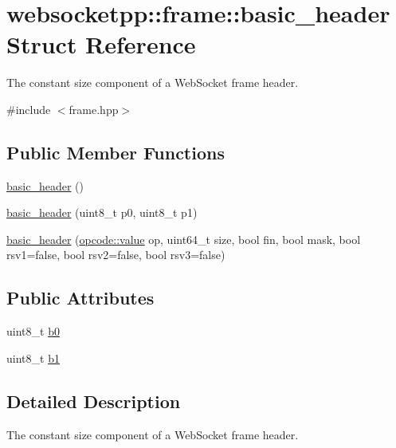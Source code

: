 \hypertarget{structwebsocketpp_1_1frame_1_1basic__header}{}\section{websocketpp\+:\+:frame\+:\+:basic\+\_\+header Struct Reference}
\label{structwebsocketpp_1_1frame_1_1basic__header}


The constant size component of a Web\+Socket frame header.  




{\ttfamily \#include $<$frame.\+hpp$>$}

\subsection*{Public Member Functions}
\begin{DoxyCompactItemize}
\item 
\hyperlink{structwebsocketpp_1_1frame_1_1basic__header_a96fc2802ba0909349105ab661f926459}{basic\+\_\+header} ()
\item 
\hyperlink{structwebsocketpp_1_1frame_1_1basic__header_ae5d978e632e2de210f0282d474870774}{basic\+\_\+header} (uint8\+\_\+t p0, uint8\+\_\+t p1)
\item 
\hyperlink{structwebsocketpp_1_1frame_1_1basic__header_aeacd25eb8ca55f29250dc5aff78a1788}{basic\+\_\+header} (\hyperlink{namespacewebsocketpp_1_1frame_1_1opcode_ae68711643096dfc4af6d66ade3f9fd5e}{opcode\+::value} op, uint64\+\_\+t size, bool fin, bool mask, bool rsv1=false, bool rsv2=false, bool rsv3=false)
\end{DoxyCompactItemize}
\subsection*{Public Attributes}
\begin{DoxyCompactItemize}
\item 
uint8\+\_\+t \hyperlink{structwebsocketpp_1_1frame_1_1basic__header_a9dcac77e651c455cf3aed687dbd87d7e}{b0}
\item 
uint8\+\_\+t \hyperlink{structwebsocketpp_1_1frame_1_1basic__header_a631a0cbf798d7996a4de1d62f03cc470}{b1}
\end{DoxyCompactItemize}


\subsection{Detailed Description}
The constant size component of a Web\+Socket frame header. 

